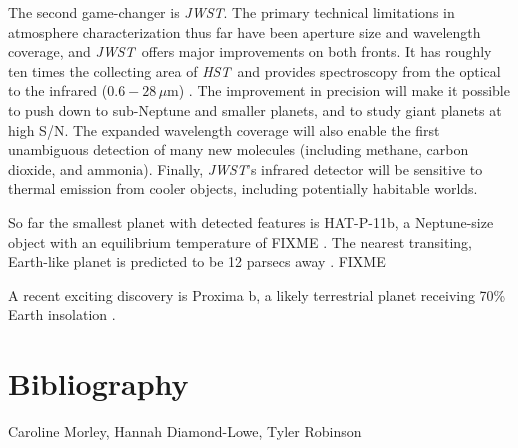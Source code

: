 \documentclass[graybox,natbib,nosecnum]{svmult}
\newcommand{\project}[1]{\textsl{#1}}
\newcommand{\JWST}{\project{JWST}}
\newcommand{\HST}{\project{HST}}
\begin{document}
The second game-changer is \JWST. The primary technical limitations in atmosphere characterization thus far have been aperture size and wavelength coverage, and \JWST\ offers major improvements on both fronts. It has roughly ten times the collecting area of \HST\, and provides spectroscopy from the optical to the infrared ($0.6 - 28\,\mu$m) \citep{FIXME}. The improvement in precision will make it possible to push down to sub-Neptune and smaller planets, and to study giant planets at high S/N. The expanded wavelength coverage will also enable the first unambiguous detection of many new molecules (including methane, carbon dioxide, and ammonia). Finally, \JWST's infrared detector will be sensitive to thermal emission from cooler objects, including potentially habitable worlds.


So far the smallest planet with detected features is HAT-P-11b, a Neptune-size object with an equilibrium temperature of FIXME \citep{fraine14}.
The nearest transiting, Earth-like planet is predicted to be 12 parsecs away \citep{dressing16}. FIXME

A recent exciting discovery is Proxima b, a likely terrestrial planet receiving 70\% Earth insolation \citep{anglada16}. 

\section{Bibliography}

\begin{acknowledgement}
Caroline Morley, Hannah Diamond-Lowe, Tyler Robinson
\end{acknowledgement}

\end{document}

